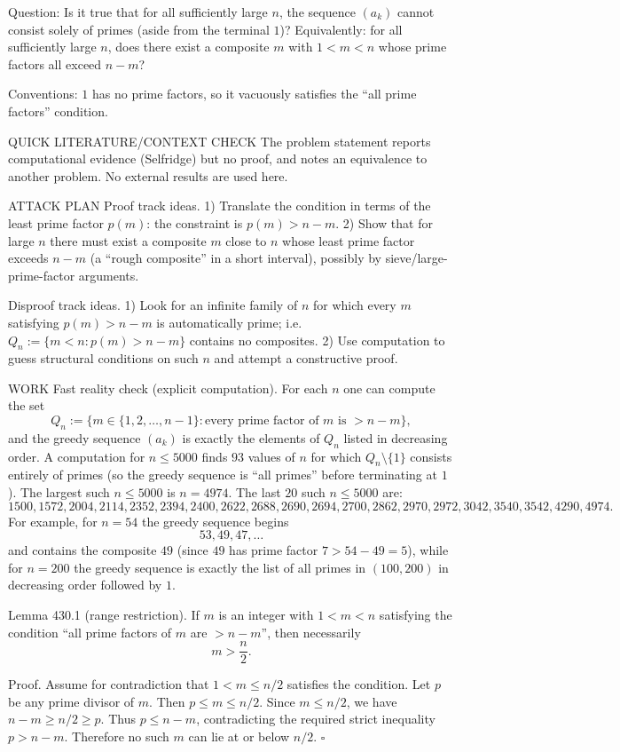 Question: Is it true that for all sufficiently large $n$, the sequence $(a_k)$ cannot consist solely of primes (aside from the terminal $1$)?
Equivalently: for all sufficiently large $n$, does there exist a composite $m$ with $1<m<n$ whose prime factors all exceed $n-m$?

Conventions: $1$ has no prime factors, so it vacuously satisfies the “all prime factors” condition.

QUICK LITERATURE/CONTEXT CHECK
The problem statement reports computational evidence (Selfridge) but no proof, and notes an equivalence to another problem. No external results are used here.

ATTACK PLAN
Proof track ideas.
1) Translate the condition in terms of the least prime factor $p(m)$: the constraint is $p(m)>n-m$.
2) Show that for large $n$ there must exist a composite $m$ close to $n$ whose least prime factor exceeds $n-m$ (a “rough composite” in a short interval), possibly by sieve/large-prime-factor arguments.

Disproof track ideas.
1) Look for an infinite family of $n$ for which every $m$ satisfying $p(m)>n-m$ is automatically prime; i.e. $Q_n:=\{m<n: p(m)>n-m\}$ contains no composites.
2) Use computation to guess structural conditions on such $n$ and attempt a constructive proof.

WORK
Fast reality check (explicit computation).
For each $n$ one can compute the set
\[
Q_n:=\{m\in\{1,2,\dots,n-1\}: \text{every prime factor of }m\text{ is } > n-m\},
\]
and the greedy sequence $(a_k)$ is exactly the elements of $Q_n$ listed in decreasing order.
A computation for $n\le 5000$ finds $93$ values of $n$ for which $Q_n\setminus\{1\}$ consists entirely of primes (so the greedy sequence is “all primes” before terminating at $1$).
The largest such $n\le 5000$ is $n=4974$.
The last $20$ such $n\le 5000$ are:
\[
1500,1572,2004,2114,2352,2394,2400,2622,2688,2690,2694,2700,2862,2970,2972,3042,3540,3542,4290,4974.
\]
For example, for $n=54$ the greedy sequence begins
\[
53,49,47,\dots
\]
and contains the composite $49$ (since $49$ has prime factor $7>54-49=5$), while for $n=200$ the greedy sequence is exactly the list of all primes in $(100,200)$ in decreasing order followed by $1$.

Lemma 430.1 (range restriction).
If $m$ is an integer with $1<m<n$ satisfying the condition “all prime factors of $m$ are $>n-m$”, then necessarily
\[
 m>\frac n2.
\]

Proof.
Assume for contradiction that $1<m\le n/2$ satisfies the condition.
Let $p$ be any prime divisor of $m$. Then $p\le m\le n/2$.
Since $m\le n/2$, we have $n-m\ge n/2\ge p$.
Thus $p\le n-m$, contradicting the required strict inequality $p>n-m$.
Therefore no such $m$ can lie at or below $n/2$.
\hfill $\square$

